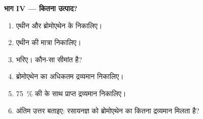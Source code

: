 \begin{problem}[{सप्ताहांत समस्या --- दस ग्राम एथीन से: कितना
ब्रोमोएथेन?}]
\medskip
\noindent\textbf{भाग IV --- कितना उत्पाद?}
\begin{enumerate}[resume]
  \item एथीन और ब्रोमोएथेन के  निकालिए।
  \item एथीन की मात्रा निकालिए।
  \item {} भरिए। कौन-सा  सीमांत है?
  \item ब्रोमोएथेन का अधिकतम द्रव्यमान निकालिए।
  \item \qty{75}{\percent} की  के साथ प्राप्त द्रव्यमान निकालिए।
  \item अंतिम उत्तर बताइए: रसायनज्ञ को ब्रोमोएथेन का कितना द्रव्यमान
        मिलता है?
\end{enumerate}
\end{problem}

